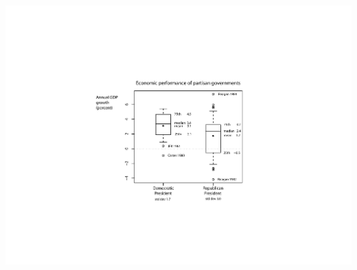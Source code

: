 \documentclass[pdflatex,landscape,titlepage]{foils}
\begin{document}
\begin{center}
\color{black}
\includegraphics[width=9 in]{gdpbox4}
\color{white}
\end{center}
\end{document}
